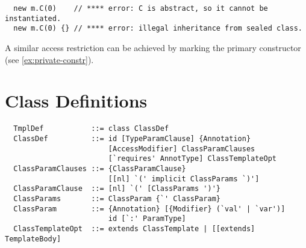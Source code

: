\begin{lstlisting}
  new m.C(0)    // **** error: C is abstract, so it cannot be instantiated.
  new m.C(0) {} // **** error: illegal inheritance from sealed class.
\end{lstlisting}

A similar access restriction can be achieved by marking the primary
constructor  (see \ref{ex:private-constr}).

\section{Class Definitions}
\label{sec:class-defs}

\syntax\begin{lstlisting} 
  TmplDef           ::= class ClassDef 
  ClassDef          ::= id [TypeParamClause] {Annotation} 
                        [AccessModifier] ClassParamClauses 
                        [`requires' AnnotType] ClassTemplateOpt 
  ClassParamClauses ::= {ClassParamClause} 
                        [[nl] `(' implicit ClassParams `)']
  ClassParamClause  ::= [nl] `(' [ClassParams ')'} 
  ClassParams       ::= ClassParam {`' ClassParam}
  ClassParam        ::= {Annotation} [{Modifier} (`val' | `var')] 
                        id [`:' ParamType]
  ClassTemplateOpt  ::= extends ClassTemplate | [[extends] TemplateBody]
\end{lstlisting}

